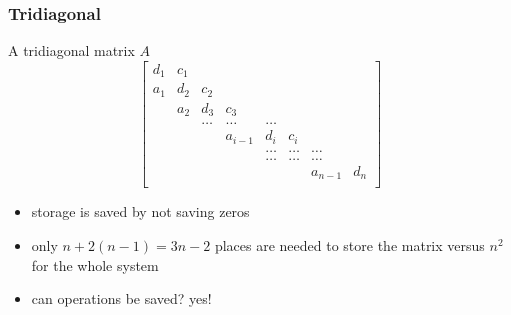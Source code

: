 \documentclass[10pt]{beamer}
\begin{document}
\begin{frame}
\frametitle{Tridiagonal}
A tridiagonal matrix $A$
\begin{equation*}
  \begin{bmatrix}
d_1 & c_1 &       &         &       &       &          &    \\
a_1 & d_2 & c_2   &         &       &       &          &    \\
    & a_2 & d_3   & c_3     &       &       &          &    \\
    &     & \dots & \dots   & \dots &       &          &    \\
    &     &       & a_{i-1} & d_i   & c_{i} &          &    \\
    &     &       &         & \dots & \dots & \dots    &    \\
    &     &       &         & \dots & \dots & \dots    &    \\
    &     &       &         &       &       & a_{n-1}  & d_n   \\
  \end{bmatrix}
\end{equation*}
\begin{itemize}
  \item storage is saved by not saving zeros
  \item only $n+2(n-1) = 3n-2$ places are needed to store the matrix
versus $n^2$ for the whole system
  \item can operations be saved?  yes!
\end{itemize}
\end{frame}
\end{document}
